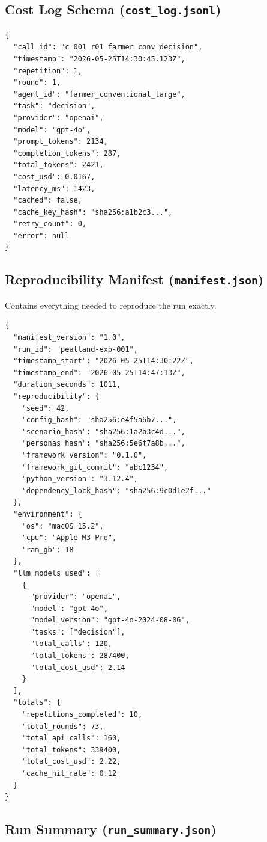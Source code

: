 \documentclass[12pt, a4paper]{article}
\begin{document}
\subsection{Cost Log Schema (\texttt{cost\_log.jsonl})}

\begin{lstlisting}[style=json, caption={Cost log entry per API call.}, label={lst:costlog}]
{
  "call_id": "c_001_r01_farmer_conv_decision",
  "timestamp": "2026-05-25T14:30:45.123Z",
  "repetition": 1,
  "round": 1,
  "agent_id": "farmer_conventional_large",
  "task": "decision",
  "provider": "openai",
  "model": "gpt-4o",
  "prompt_tokens": 2134,
  "completion_tokens": 287,
  "total_tokens": 2421,
  "cost_usd": 0.0167,
  "latency_ms": 1423,
  "cached": false,
  "cache_key_hash": "sha256:a1b2c3...",
  "retry_count": 0,
  "error": null
}
\end{lstlisting}

\subsection{Reproducibility Manifest (\texttt{manifest.json})}

Contains everything needed to reproduce the run exactly.

\begin{lstlisting}[style=json, caption={Reproducibility manifest (abbreviated).}, label={lst:manifest}]
{
  "manifest_version": "1.0",
  "run_id": "peatland-exp-001",
  "timestamp_start": "2026-05-25T14:30:22Z",
  "timestamp_end": "2026-05-25T14:47:13Z",
  "duration_seconds": 1011,
  "reproducibility": {
    "seed": 42,
    "config_hash": "sha256:e4f5a6b7...",
    "scenario_hash": "sha256:1a2b3c4d...",
    "personas_hash": "sha256:5e6f7a8b...",
    "framework_version": "0.1.0",
    "framework_git_commit": "abc1234",
    "python_version": "3.12.4",
    "dependency_lock_hash": "sha256:9c0d1e2f..."
  },
  "environment": {
    "os": "macOS 15.2",
    "cpu": "Apple M3 Pro",
    "ram_gb": 18
  },
  "llm_models_used": [
    {
      "provider": "openai",
      "model": "gpt-4o",
      "model_version": "gpt-4o-2024-08-06",
      "tasks": ["decision"],
      "total_calls": 120,
      "total_tokens": 287400,
      "total_cost_usd": 2.14
    }
  ],
  "totals": {
    "repetitions_completed": 10,
    "total_rounds": 73,
    "total_api_calls": 160,
    "total_tokens": 339400,
    "total_cost_usd": 2.22,
    "cache_hit_rate": 0.12
  }
}
\end{lstlisting}

\subsection{Run Summary (\texttt{run\_summary.json})}
\end{document}
